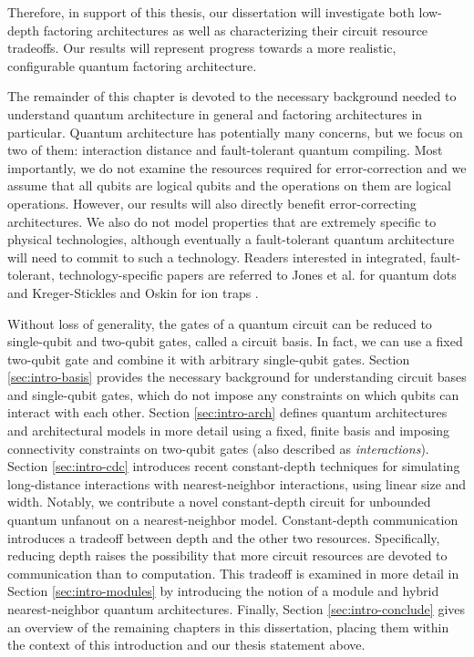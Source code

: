  Therefore,
in support of this thesis,
our dissertation will investigate both low-depth factoring architectures
as well as characterizing their circuit resource tradeoffs.
Our results will represent progress towards a more realistic, configurable
quantum factoring architecture.


The remainder of this chapter is devoted to the necessary background needed
to understand quantum architecture in general and factoring architectures
in particular. Quantum architecture has potentially many concerns, but we
focus on two of them: interaction distance and fault-tolerant quantum compiling.
Most importantly, we do not examine the resources required for error-correction
and we assume that all qubits are logical qubits and the operations on them
are logical operations. However, our results will also directly benefit
error-correcting architectures. We also do not model properties that are extremely
specific to physical technologies, although eventually a
fault-tolerant quantum architecture will need to commit to such a technology.
Readers interested in integrated, fault-tolerant,
technology-specific papers are referred
to Jones et al. for quantum dots \cite{Jones2010}
and Kreger-Stickles and Oskin for ion traps \cite{Kreger-Stickles2008}.

Without loss of generality, the gates of a quantum circuit can be reduced to
single-qubit and two-qubit gates, called a circuit basis.
In fact, we can use a fixed two-qubit gate
and combine it with arbitrary single-qubit gates.
Section \ref{sec:intro-basis} provides the necessary background for
understanding circuit bases and single-qubit gates,
which do not impose any constraints on
which qubits can interact with each other. Section \ref{sec:intro-arch}
defines quantum architectures and architectural models in more detail using a
fixed, finite basis
and imposing connectivity constraints on two-qubit gates (also
described as \emph{interactions}).
Section \ref{sec:intro-cdc} introduces recent constant-depth techniques
for simulating long-distance interactions with nearest-neighbor
interactions, using linear size and width. Notably, we contribute
a novel constant-depth circuit for
unbounded quantum unfanout on a nearest-neighbor model.
 Constant-depth communication
introduces a tradeoff between depth and the other two resources. Specifically,
reducing depth raises the possibility that more circuit resources are
devoted to communication than to computation. This tradeoff is examined 
in more detail in Section \ref{sec:intro-modules}
by introducing the notion of a module and hybrid nearest-neighbor
quantum architectures.
Finally, Section \ref{sec:intro-conclude}
gives an overview of the remaining chapters in this dissertation,
placing them within the context of this introduction and our thesis statement
above.









